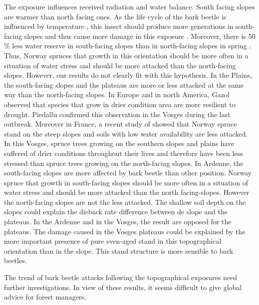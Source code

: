 \documentclass[3p,procedia]{elsarticle}
\begin{document}
The exposure  influences received radiation and water balance.
South facing slopes are warmer than north facing ones. %
As the life cycle of the bark beetle is influenced by temperature \citep{baier_phenipscomprehensive_2007},
this insect should produce more generations in south-facing slopes and thus cause  more damage in this exposure \citep{jakus_1995}.
Moreover, there is 50 \% less water reserve in south-facing slopes than in north-facing slopes in spring \citep{Rouse_1969}.
Thus, Norway spruces that growth in this orientation should be more often in a situation of water stress and should be more attacked than the north-facing slopes.
However, our results do not  clearly fit with this hypothesis. In the Plains, the south-facing slopes and the plateaus are more or less attacked at the same way than the north-facing slopes. In Europe and in north America, Gazol \citep{gazol_2017} observed that species that grow in drier condition area are more resilient to drought.
Piedallu \citep{piedallu_spatial_2022} confirmed this observation in the Vosges during the last outbreak.
Moreover in France, a recent study of \cite{nardi_drought_2022} showed that Norway spruce stand on the steep slopes and soils with low water availability are less attacked.
In this Vosges, spruce trees growing on the southern slopes and plains have suffered of drier conditions throughout their lives and therefore have been less stressed than spruce trees growing on the north-facing slopes.
In Ardenne, the south-facing slopes are more affected by bark beetle than other position.
Norway spruce that growth in south-facing slopes should be more often in a situation of water stress and should be more attacked than the north facing-slopes.
However the north-facing slopes are not the less attacked. 
The shallow soil depth on the slopes could explain the dieback rate difference between de slope and the plateaus. 
In the Ardenne and in the Vosges, the result are opposed for the plateaus.
The damage caused in the Vosges plateaus could be explained by the more important presence of pure even-aged stand in this topographical orientation than in the slope.
This stand structure is more sensible to bark beetles.

The trend of bark beetle attacks following the topographical exposures need further investigations.
In view of these results, it seems difficult to give global advice for forest managers.
\end{document}
